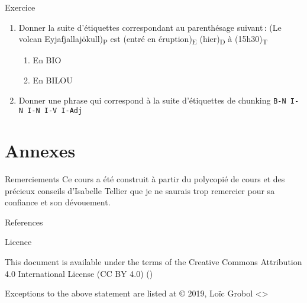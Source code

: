\documentclass[xcolor={svgnames}, french]{beamer}
\begin{document}
\begin{frame}{Exercice}
	\begin{enumerate}
		\item Donner la suite d'étiquettes correspondant au parenthésage suivant : (Le volcan Eyjafjallajökull)\textsubscript{P} est (entré en éruption)\textsubscript{E} (hier)\textsubscript{D} à (15h30)\textsubscript{T}
			\begin{enumerate}
				\item En BIO
				\item En BILOU
			\end{enumerate}
		\item Donner une phrase qui correspond à la suite d'étiquettes de chunking \texttt{B-N I-N I-N I-V I-Adj}
	\end{enumerate}
\end{frame}




\appendix
{}  %
\section{Annexes}
\begin{frame}{Remerciements}
	Ce cours a été construit à partir du polycopié de cours  \parencite{tellier2017IntroductionFouilleTextes} et des précieux conseils d'Isabelle Tellier que je ne saurais trop remercier pour sa confiance et son dévouement.
\end{frame}

\begin{frame}[allowframebreaks]{References}
	\printbibliography[heading=none]
\end{frame}

\begin{frame}{Licence}
	\begin{center}
		{\huge \ccby}
		\vfill
		This document is available under the terms of the Creative Commons Attribution 4.0 International License (CC BY 4.0) ()

		Exceptions to the above statement are listed at {\small{}}
		\vfill
		© 2019, Loïc Grobol <>

	\end{center}
\end{frame}
\end{document}
